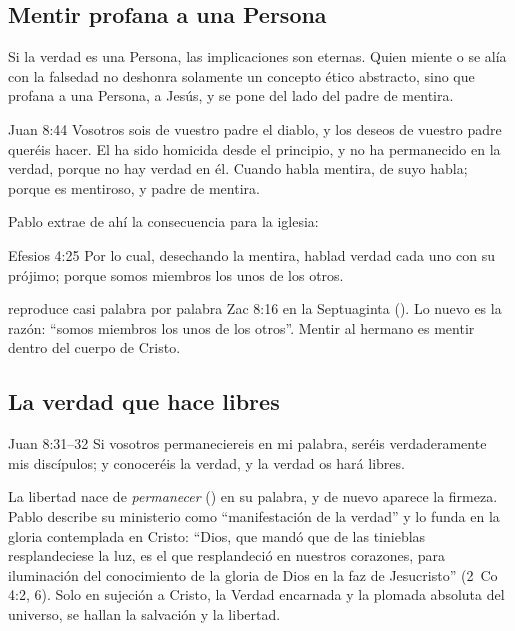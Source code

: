 \subsection{Mentir profana a una Persona}
Si la verdad es una Persona, las implicaciones son eternas. Quien miente o se alía con la falsedad no deshonra solamente un concepto ético abstracto, sino que profana a una Persona, a Jesús, y se pone del lado del padre de mentira.

\begin{verso}{Juan 8:44}
Vosotros sois de vuestro padre el diablo, y los deseos de vuestro padre queréis hacer. El ha sido homicida desde el principio, y no ha permanecido en la verdad, porque no hay verdad en él. Cuando habla mentira, de suyo habla; porque es mentiroso, y padre de mentira.
\end{verso}

Pablo extrae de ahí la consecuencia para la iglesia:

\begin{verso}{Efesios 4:25}
Por lo cual, desechando la mentira, hablad verdad cada uno con su prójimo; porque somos miembros los unos de los otros.
\end{verso}

 reproduce casi palabra por palabra Zac 8:16 en la Septuaginta (). Lo nuevo es la razón: ``somos miembros los unos de los otros''. Mentir al hermano es mentir dentro del cuerpo de Cristo.

\subsection{La verdad que hace libres}
\begin{verso}{Juan 8:31–32}
Si vosotros permaneciereis en mi palabra, seréis verdaderamente mis discípulos; y conoceréis la verdad, y la verdad os hará libres.
\end{verso}

La libertad nace de \emph{permanecer} () en su palabra, y de nuevo aparece la firmeza. Pablo describe su ministerio como ``manifestación de la verdad'' y lo funda en la gloria contemplada en Cristo: ``Dios, que mandó que de las tinieblas resplandeciese la luz, es el que resplandeció en nuestros corazones, para iluminación del conocimiento de la gloria de Dios en la faz de Jesucristo'' (2~Co 4:2, 6). Solo en sujeción a Cristo, la Verdad encarnada y la plomada absoluta del universo, se hallan la salvación y la libertad.

